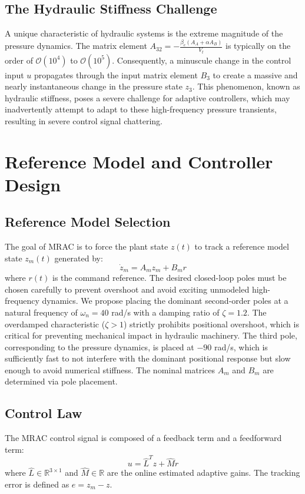 \documentclass[12pt,a4paper]{article}
\begin{document}
\subsection{The Hydraulic Stiffness Challenge}
A unique characteristic of hydraulic systems is the extreme magnitude of the pressure dynamics. The matrix element $A_{32} = -\frac{\beta_e (A_A + \alpha A_B)}{V_t}$ is typically on the order of $\mathcal{O}(10^4)$ to $\mathcal{O}(10^5)$. Consequently, a minuscule change in the control input $u$ propagates through the input matrix element $B_3$ to create a massive and nearly instantaneous change in the pressure state $z_3$. This phenomenon, known as hydraulic stiffness, poses a severe challenge for adaptive controllers, which may inadvertently attempt to adapt to these high-frequency pressure transients, resulting in severe control signal chattering.

\section{Reference Model and Controller Design}
\subsection{Reference Model Selection}
The goal of MRAC is to force the plant state $z(t)$ to track a reference model state $z_m(t)$ generated by:
\begin{equation}
    \dot{z}_m = A_m z_m + B_m r
\end{equation}
where $r(t)$ is the command reference. The desired closed-loop poles must be chosen carefully to prevent overshoot and avoid exciting unmodeled high-frequency dynamics. We propose placing the dominant second-order poles at a natural frequency of $\omega_n = 40$ rad/s with a damping ratio of $\zeta = 1.2$. The overdamped characteristic ($\zeta > 1$) strictly prohibits positional overshoot, which is critical for preventing mechanical impact in hydraulic machinery. The third pole, corresponding to the pressure dynamics, is placed at $-90$ rad/s, which is sufficiently fast to not interfere with the dominant positional response but slow enough to avoid numerical stiffness. The nominal matrices $A_m$ and $B_m$ are determined via pole placement.

\subsection{Control Law}
The MRAC control signal is composed of a feedback term and a feedforward term:
\begin{equation}
    u = \hat{L}^T z + \hat{M} r
\end{equation}
where $\hat{L} \in \mathbb{R}^{3\times 1}$ and $\hat{M} \in \mathbb{R}$ are the online estimated adaptive gains. The tracking error is defined as $e = z_m - z$.
\end{document}
